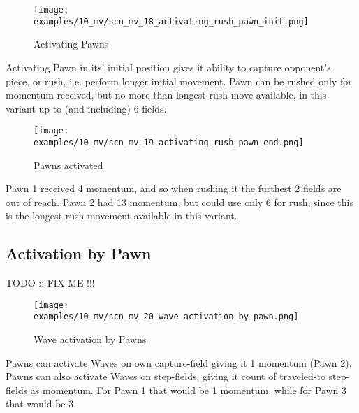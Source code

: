 \noindent
\begin{figure}[!h]
\texttt{[image: examples/10\_mv/scn\_mv\_18\_activating\_rush\_pawn\_init.png]}
\caption{Activating Pawns}
\label{fig:scn_mv_18_activating_rush_pawn_init}
\end{figure}

Activating Pawn in its' initial position gives it ability to capture opponent's
piece, or rush, i.e. perform longer initial movement. Pawn can be rushed only for
momentum received, but no more than longest rush move available, in this variant
up to (and including) 6 fields.

\clearpage %

\noindent
\begin{figure}[!h]
\texttt{[image: examples/10\_mv/scn\_mv\_19\_activating\_rush\_pawn\_end.png]}
\caption{Pawns activated}
\label{fig:scn_mv_19_activating_rush_pawn_end}
\end{figure}

Pawn 1 received 4 momentum, and so when rushing it the furthest 2 fields are out 
of reach. Pawn 2 had 13 momentum, but could use only 6 for rush, since this is the 
longest rush movement available in this variant.

\clearpage %

\subsection*{Activation by Pawn}

\huge{TODO :: FIX ME !!!} 
\normalsize{}

\noindent
\begin{figure}[!h]
\texttt{[image: examples/10\_mv/scn\_mv\_20\_wave\_activation\_by\_pawn.png]}
\caption{Wave activation by Pawns}
\label{fig:scn_mv_20_wave_activation_by_pawn}
\end{figure}

Pawns can activate Waves on own capture-field giving it 1 momentum (Pawn 2).
Pawns can also activate Waves on step-fields, giving it count of traveled-to
step-fields as momentum. For Pawn 1 that would be 1 momentum, while for Pawn 3
that would be 3.

